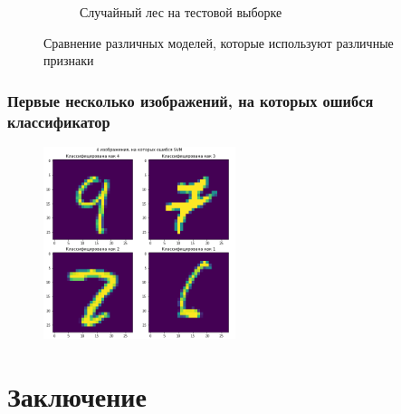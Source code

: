 \documentclass{beamer}
\begin{document}
\begin{frame}
\begin{figure}[!htbp]
\begin{subfigure}{0.25\textwidth}
					\caption{Случайный лес на тестовой выборке}
					\label{fig:6}
				\end{subfigure}
				\caption{Сравнение различных моделей, которые используют различные признаки}
				\label{accuracies_diff_features}
			\end{figure}
		\end{frame}
		\begin{frame}
			\frametitle{Первые несколько изображений, на которых ошибся классификатор}
			\begin{figure}[!htbp]
				\begin{center}
					\includegraphics[width=0.5\textwidth]{missclassified.png}\\
					\label{missclassified}
				\end{center}
			\end{figure}
		\end{frame}
		
	\section{Заключение}
\end{document}
